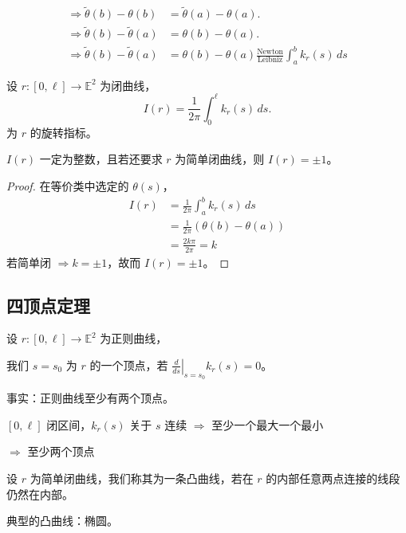 \documentclass[lang=cn,10pt,thmcnt=section]{elegantbook}
\begin{document}
\begin{align*}
    \Rightarrow \tilde{\theta}(b) - \theta(b) &= \tilde{\theta}(a) - \theta(a). \\
    \Rightarrow \tilde{\theta}(b) - \tilde{\theta}(a) &= \theta(b) - \theta(a). \\
    \Rightarrow \tilde{\theta}(b) - \tilde{\theta}(a) &= \theta(b) - \theta(a) \frac{\text{Newton}}{\text{Leibniz}} \int_a^b k_r(s) \, ds
\end{align*}
\begin{definition}[旋转指标]
    设 $r: [0, \ell] \rightarrow \mathbb{E}^2$ 为闭曲线，
$$I(r) = \frac{1}{2\pi} \int_0^{\ell} k_r(s) \, ds.$$
为 $r$ 的旋转指标。
\end{definition}

\begin{theorem}[旋转指标定理]
    $I(r)$ 一定为整数，且若还要求 $r$ 为简单闭曲线，则 $I(r) = \pm 1$。
    \end{theorem}
\begin{proof}
    在等价类中选定的 $\theta(s)$，
    \begin{align*}
    I(r) &= \frac{1}{2\pi} \int_a^b k_r(s) \, ds \\
    &= \frac{1}{2\pi} (\theta(b) - \theta(a)) \\
    &= \frac{2k\pi}{2\pi} = k
    \end{align*}
    若简单闭 $\Rightarrow k = \pm 1$，故而 $I(r) = \pm 1$。
\end{proof}
\subsection{四顶点定理}  
\begin{definition}[顶点]
    设 $r: [0, \ell] \rightarrow \mathbb{E}^2$ 为正则曲线，

我们 $s = s_0$ 为 $r$ 的一个顶点，若 $\left. \frac{d}{ds} \right|_{s=s_0} k_r(s) = 0$。
\end{definition}

事实：正则曲线至少有两个顶点。

$[0, \ell]$ 闭区间，$k_r(s)$ 关于 $s$ 连续 $\Rightarrow$ 至少一个最大一个最小

$\Rightarrow$ 至少两个顶点

\begin{definition}[凸曲线]
设 $r$ 为简单闭曲线，我们称其为一条凸曲线，若在 $r$ 的内部任意两点连接的线段仍然在内部。

\end{definition}
典型的凸曲线：椭圆。
\end{document}
